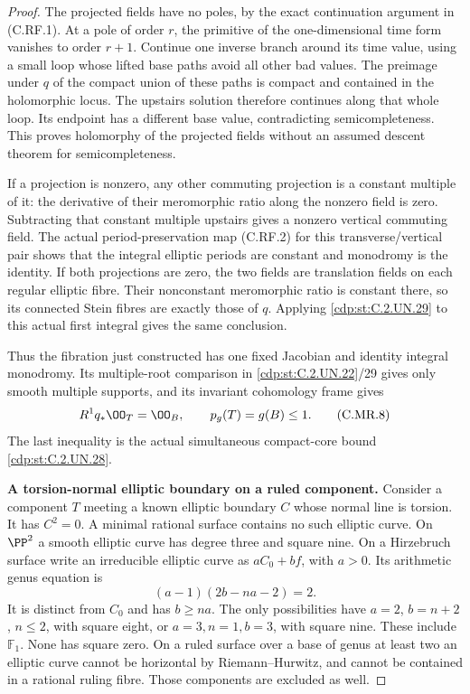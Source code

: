 \begin{proof}
The projected fields have no poles, by the exact
continuation argument in (C.RF.1). At a pole of
order $r$, the primitive of the one-dimensional
time form vanishes to order $r+1$. Continue one
inverse branch around its time value, using a
small loop whose lifted base paths avoid all
other bad values. The preimage under $q$ of
the compact union of these paths is compact
and contained in the holomorphic locus.
The upstairs solution therefore continues
along that whole loop. Its endpoint has a
different base value, contradicting
semicompleteness. This proves holomorphy of
the projected fields without an assumed
descent theorem for semicompleteness.

If a projection is nonzero, any other commuting
projection is a constant multiple of it:
the derivative of their meromorphic ratio
along the nonzero field is zero. Subtracting
that constant multiple upstairs gives a
nonzero vertical commuting field. The
actual period-preservation map (C.RF.2)
for this transverse/vertical pair shows
that the integral elliptic periods are
constant and monodromy is the identity.
If both projections are zero, the two
fields are translation fields on each
regular elliptic fibre. Their nonconstant
meromorphic ratio is constant there,
so its connected Stein fibres are
exactly those of $q$. Applying \ref{cdp:st:C.2.UN.29}
to this actual first integral gives
the same conclusion.

Thus the fibration just constructed has
one fixed Jacobian and identity integral
monodromy. Its multiple-root comparison
in \ref{cdp:st:C.2.UN.22}/29 gives only smooth multiple
supports, and its invariant cohomology
frame gives
\[
             R^1q_*\OO_T=\OO_B,\qquad
                         p_g(T)=g(B)\le1.
\tag{C.MR.8}\label{cdp:eq:C.MR.8}
\]
The last inequality is the actual simultaneous
compact-core bound \ref{cdp:st:C.2.UN.28}.

\par\medskip\noindent\textbf{A torsion-normal elliptic boundary on a ruled component.}
Consider a component $T$ meeting a known elliptic
boundary $C$ whose normal line is torsion. It has
$C^2=0$. A minimal rational surface contains no
such elliptic curve. On $\PP^2$ a smooth elliptic
curve has degree three and square nine. On a
Hirzebruch surface write an irreducible elliptic
curve as $aC_0+bf$, with $a>0$. Its arithmetic
genus equation is
\[
           (a-1)(2b-na-2)=2.
\tag{C.MR.9}\label{cdp:eq:C.MR.9}
\]
It is distinct from $C_0$ and has $b\ge na$.
The only possibilities have $a=2$, $b=n+2$,
$n\le2$, with square eight, or $a=3,n=1,b=3$,
with square nine. These include $\mathbb F_1$.
None has square zero. On a ruled surface over
a base of genus at least two an elliptic curve
cannot be horizontal by Riemann--Hurwitz, and
cannot be contained in a rational ruling fibre.
Those components are excluded as well.


\end{proof}
